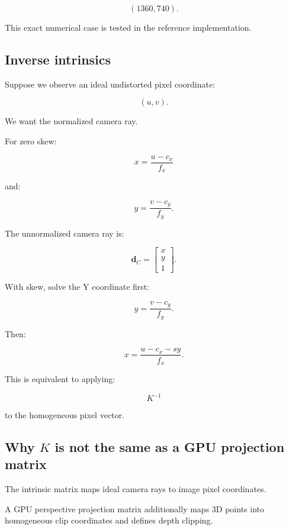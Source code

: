 \[
 \boxed{(1360,740)}.
\]

This exact numerical case is tested in the reference implementation.

\subsection{Inverse intrinsics}\label{02-foundations-ii-ch034-inverse-intrinsics}

\hypertarget{02-foundations-ii-ch034-inverse-intrinsics}{}

Suppose we observe an ideal undistorted pixel coordinate:

\[
 (u,v).
\]

We want the normalized camera ray.

For zero skew:

\[
 \boxed{ x=\frac{u-c_x}{f_x} }
\]

and:

\[
 \boxed{ y=\frac{v-c_y}{f_y} }.
\]

The unnormalized camera ray is:

\[
 \boxed{ \mathbf d_C= \begin{bmatrix} x\\y\\1 \end{bmatrix} }.
\]

With skew, solve the Y coordinate first:

\[
 y=\frac{v-c_y}{f_y}.
\]

Then:

\[
 \boxed{ x=\frac{u-c_x-sy}{f_x} }.
\]

This is equivalent to applying:

\[
 K^{-1}
\]

to the homogeneous pixel vector.

\subsection{\texorpdfstring{Why \(K\) is not the same as a GPU projection matrix}{Why K is not the same as a GPU projection matrix}}\label{02-foundations-ii-ch034-why-k-is-not-the-same-as-a-gpu-projection-matrix}

\hypertarget{02-foundations-ii-ch034-why-k-is-not-the-same-as-a-gpu-projection-matrix}{}

The intrinsic matrix maps ideal camera rays to image pixel coordinates.

A GPU perspective projection matrix additionally maps 3D points into homogeneous clip coordinates and defines depth clipping.

